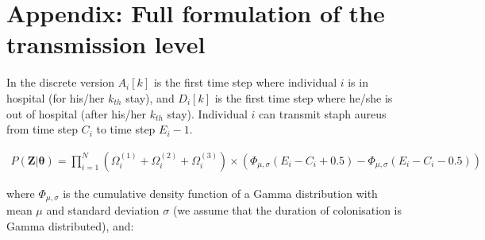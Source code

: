 \documentclass[10pt]{article}
\begin{document}
\section*{Appendix: Full formulation of the transmission level}

In the discrete version $A_i[k]$ is the first time step where individual $i$ is in hospital (for his/her $k_{th}$ stay), and $D_i[k]$ is the first time step where he/she is out of hospital (after his/her $k_{th}$ stay). Individual $i$ can transmit staph aureus from time step $C_i$ to time step $E_i-1$. 

\begin{eqnarray*}
P\left(\bm{Z}|\bm{\theta}\right) = 
\bm{\prod}_{i=1}^N %
\left( \Omega_i^{\left(1\right)} + \Omega_i^{\left(2\right)} + \Omega_i^{\left(3\right)} \right) \times \left(\Phi_{\mu,\sigma}\left(E_i-C_i+0.5\right) - \Phi_{\mu,\sigma}\left(E_i-C_i-0.5\right) \right)
\end{eqnarray*}

\noindent where $\Phi_{\mu,\sigma}$ is the cumulative density function of a Gamma distribution with mean $\mu$ and standard deviation $\sigma$ (we assume that the duration of colonisation is Gamma distributed), and: 
\end{document}
